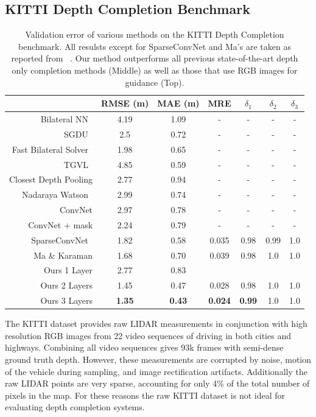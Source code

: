 \subsection{KITTI Depth Completion Benchmark}
\label{sec:kitti-depth-compl}
\begin{table}
\centering
\begin{tabular}{r|cccccc}
  \label{table:kitti}
  & RMSE (m) & MAE (m) & MRE & $\delta_1$ & $\delta_2$ & $\delta_3$\\\hline
  Bilateral NN~\cite{} & 4.19 & 1.09 & - & - & - & -\\
  SGDU~\cite{} & 2.5 & 0.72 & - & - & - & -\\
  Fast Bilateral Solver~\cite{} & 1.98 & 0.65 & - & - & - & -\\
  TGVL~\cite{} & 4.85 & 0.59 & - & - & - & -\\\hline
  Closest Depth Pooling & 2.77 & 0.94 & - & - & - & -\\
  Nadaraya Watson~\cite{} & 2.99 & 0.74 & - & - & - & -\\
  ConvNet & 2.97 & 0.78 & - & - & - & -\\
  ConvNet + mask & 2.24 & 0.79 & - & - & - & -\\
  SparseConvNet~\cite{} & 1.82 & 0.58 & 0.035 & 0.98 & 0.99 & 1.0\\
  Ma \& Karaman & 1.68 & 0.70 & 0.039 & 0.98 & 1.0 & 1.0\\\hline
  Ours 1 Layer & 2.77 & 0.83\\
  Ours 2 Layers & 1.45 & 0.47 & 0.028 & 0.98 & 1.0 & 1.0\\
  Ours 3 Layers & \textbf{1.35} & \textbf{0.43} & \textbf{0.024} & \textbf{0.99} & 1.0 & 1.0\\
  \hline
 \end{tabular}
 \caption{Validation error of various methods on the KITTI Depth Completion benchmark. All resulsts except for SparseConvNet and Ma's are taken as reported from ~\cite{}. Our method outperforms all previous state-of-the-art depth only completion methods (Middle) as well as those that use RGB images for guidance (Top).}
\label{fig:kitti}
\end{table}




The KITTI dataset provides raw LIDAR measurements in conjunction with high resolution RGB images from 22 video sequences of driving in both cities and highways. Combining all video sequences gives 93k frames with semi-dense ground truth depth. However, these measurements are corrupted by noise, motion of the vehicle during sampling, and image rectification artifacts. Additionally the raw LIDAR points are very sparse, accounting for only 4\% of the total number of pixels in the map. For these reasons the raw KITTI dataset is not ideal for evaluating depth completion systems.\\

